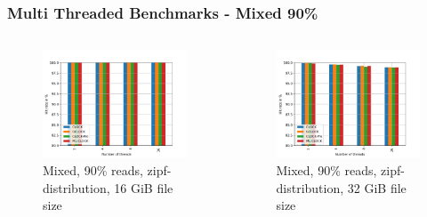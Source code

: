 \documentclass[
	aspectratio=169,
	compress,
]{beamer}
\newcommand{\navframetitle}[1]{\frametitle{#1\hfill{\footnotesize\lastsection{}}}}
\begin{document}

\begin{frame}[fragile]
	\navframetitle{Multi Threaded Benchmarks - Mixed 90\%}

	\begin{columns}
		\begin{column}{0.5\textwidth}
			\begin{figure}[ht]
    			\centering
    			\includegraphics[width=\textwidth]{multi_16_gb_rw_90to10_zipf.jpg}
        		\caption{Mixed, 90\% reads, zipf-distribution, 16 GiB file size}
			\end{figure}
		\end{column}
		\begin{column}{0.5\textwidth}
			\begin{figure}[ht]
    			\centering
    			\includegraphics[width=\textwidth]{multi_32_gb_rw_90to10_zipf.jpg}
        		\caption{Mixed, 90\% reads, zipf-distribution, 32 GiB file size}
			\end{figure}			
		\end{column}
	\end{columns}
\end{frame}
\end{document}
